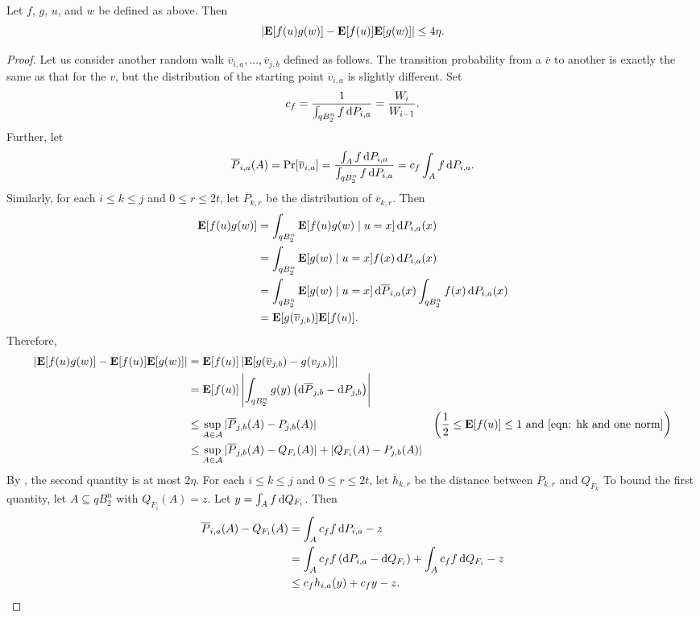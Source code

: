 \begin{lemma}
	\label{analysis lemma 2}
	Let $f$, $g$, $u$, and $w$ be defined as above. Then
	\[ \left|\textbf{E}[f(u)g(w)] - \textbf{E}[f(u)]\textbf{E}[g(w)] \right| \leq 4\eta. \]
\end{lemma}

\begin{proof}
	Let us consider another random walk $\overline{v}_{i,a},\ldots,\overline{v}_{j,b}$ defined as follows. The transition probability from a $\overline{v}$ to another is exactly the same as that for the $v$, but the distribution of the starting point $\overline{v}_{i,a}$ is slightly different. Set
	\[ c_f = \frac{1}{\int_{qB_2^n} f\operatorname{d}\!{P}_{i,a}} = \frac{W_i}{W_{i-1}}. \]
	Further, let
	\[ \overline{P}_{i,a}(A) = \Pr[\overline{v}_{i,a}] = \frac{\int_A f\operatorname{d}\!{P}_{i,a}}{\int_{qB_2^n} f\operatorname{d}\!{P}_{i,a}} = c_f\int_A f\operatorname{d}\!{P}_{i,a}. \]
	Similarly, for each $i\leq k\leq j$ and $0\leq r\leq 2t$, let $\overline{P}_{k,r}$ be the distribution of $\overline{v}_{k,r}$. Then
	\begin{align*}
		\textbf{E}[f(u)g(w)] &= \int_{qB_2^n} \textbf{E}[f(u)g(w)\mid u=x] \operatorname{d}\!{P}_{i,a}(x) \\
			&= \int_{qB_2^n} \textbf{E}[g(w)\mid u=x] f(x)\operatorname{d}\!{P}_{i,a}(x) \\
			&= \int_{qB_2^n} \textbf{E}[g(w)\mid u=x] \operatorname{d}\!{\overline{P}}_{i,a}(x) \int_{qB_2^n} f(x)\operatorname{d}\!{P}_{i,a}(x) \\
			&= \textbf{E}[g(\overline{v}_{j,b})]\textbf{E}[f(u)].
	\end{align*}
	Therefore,
	\begin{align*}
		\left| \expec[f(u)g(w)] - \expec[f(u)]\expec[g(w)] \right| &= \expec[f(u)] \left| \expec[g(\overline{v}_{j,b}) - g(v_{j,b})] \right| \\
			&= \expec[f(u)] \left| \int_{qB_2^n} g(y) \left(\d{\overline{P}}_{j,b} - \d{P}_{j,b}\right) \right| \\
			&\leq \sup_{A\in\mathcal{A}} |\overline{P}_{j,b}(A) - P_{j,b}(A)| & \left(\frac{1}{2}\leq \expec[f(u)] \leq 1 \text{ and \Cref{eqn: hk and one norm}} \right) \\
			&\leq \sup_{A\in\mathcal{A}} |\overline{P}_{j,b}(A) - Q_{F_i}(A)| + |Q_{F_i}(A) - P_{j,b}(A)|
	\end{align*}
	By , the second quantity is at most $2\eta$. %
	For each $i\leq k\leq j$ and $0\leq r\leq 2t$, let $\overline{h}_{k,r}$ be the distance between $\overline{P}_{k,r}$ and $Q_{F_k}$ To bound the first quantity, let $A\subseteq qB_2^n$ with $Q_{F_i}(A)=z$. Let $y=\int_A f\operatorname{d}\!{Q}_{F_i}$. Then
	\begin{align*}
		\overline{P}_{i,a}(A) - Q_{F_i}(A) &= \int_A c_f f \operatorname{d}\!{P}_{i,a} - z \\
			&= \int_A c_f f \left(\operatorname{d}\!{P}_{i,a} - \operatorname{d}\!{Q}_{F_i}\right) + \int_A c_f f \operatorname{d}\!{Q}_{F_i} - z \\
			&\leq c_f h_{i,a}(y) + c_f y - z. 
	\end{align*}
\end{proof}

